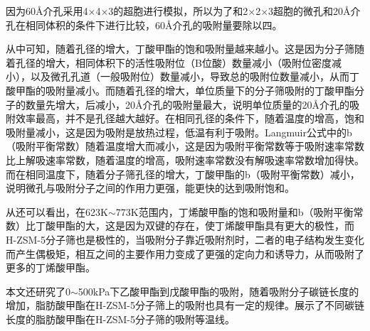 \par{因为60Å介孔采用4×4×3的超胞进行模拟，所以为了和2×2×3超胞的微孔和20Å介孔在相同体积的条件下进行比较，60Å介孔的吸附量要除以四。}
\par{从中可知，随着孔径的增大，丁酸甲酯的饱和吸附量越来越小。这是因为分子筛随着孔径的增大，相同体积下的活性吸附位（B位酸）数量减小（吸附位密度减小），以及微孔孔道（一般吸附位）数量减小，导致总的吸附位数量减小，从而丁酸甲酯的吸附量减小。而随着孔径的增大，单位质量下的分子筛吸附的丁酸甲酯分子的数量先增大，后减小，20Å介孔的吸附量最大，说明单位质量的20Å介孔的吸附效率最高，并不是孔径越大越好。在相同孔径的条件下，随着温度的增高，饱和吸附量减小，这是因为吸附是放热过程，低温有利于吸附。Langmuir公式中的b（吸附平衡常数）随着温度增大而减小，这是因为吸附平衡常数等于吸附速率常数比上解吸速率常数，随着温度的增高，吸附速率常数没有解吸速率常数增加得快。而在相同温度下，随着分子筛孔径的增大，丁酸甲酯的b（吸附平衡常数）减小，说明微孔与吸附分子之间的作用力更强，能更快的达到吸附饱和。}
\par{从还可以看出，在623K$\sim$773K范围内，丁烯酸甲酯的饱和吸附量和b（吸附平衡常数）比丁酸甲酯的大，这是因为双键的存在，使丁烯酸甲酯具有更大的极性，而H-ZSM-5分子筛也是极性的，当吸附分子靠近吸附剂时，二者的电子结构发生变化而产生偶极矩，相互之间的主要作用力变成了更强的定向力和诱导力，从而吸附了更多的丁烯酸甲酯。}
\par{本文还研究了0$\sim$500kPa下乙酸甲酯到戊酸甲酯的吸附，随着吸附分子碳链长度的增加，脂肪酸甲酯在H-ZSM-5分子筛上的吸附也具有一定的规律。展示了不同碳链长度的脂肪酸甲酯在H-ZSM-5分子筛的吸附等温线。}

